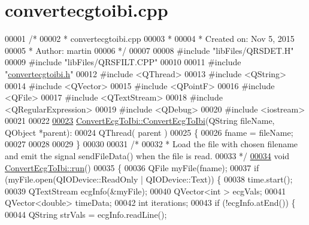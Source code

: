 \hypertarget{convertecgtoibi_8cpp_source}{}\section{convertecgtoibi.\+cpp}
\label{convertecgtoibi_8cpp_source}

\begin{DoxyCode}
00001 \textcolor{comment}{/*}
00002 \textcolor{comment}{ * convertecgtoibi.cpp}
00003 \textcolor{comment}{ *}
00004 \textcolor{comment}{ *  Created on: Nov 5, 2015}
00005 \textcolor{comment}{ *      Author: martin}
00006 \textcolor{comment}{ */}
00007 
00008 \textcolor{preprocessor}{#include "libFiles/QRSDET.H"}
00009 \textcolor{preprocessor}{#include "libFiles/QRSFILT.CPP"}
00010 
00011 \textcolor{preprocessor}{#include "\hyperlink{convertecgtoibi_8h}{convertecgtoibi.h}"}
00012 \textcolor{preprocessor}{#include <QThread>}
00013 \textcolor{preprocessor}{#include <QString>}
00014 \textcolor{preprocessor}{#include <QVector>}
00015 \textcolor{preprocessor}{#include <QPointF>}
00016 \textcolor{preprocessor}{#include <QFile>}
00017 \textcolor{preprocessor}{#include <QTextStream>}
00018 \textcolor{preprocessor}{#include <QRegularExpression>}
00019 \textcolor{preprocessor}{#include <QDebug>}
00020 \textcolor{preprocessor}{#include <iostream>}
00021 
00022 
\hypertarget{convertecgtoibi_8cpp_source.tex_l00023}{}\hyperlink{classConvertEcgToIbi_add4a7e9eceff1edadcce6e7aa417c05f}{00023} \hyperlink{classConvertEcgToIbi_add4a7e9eceff1edadcce6e7aa417c05f}{ConvertEcgToIbi::ConvertEcgToIbi}(QString fileName, QObject *parent):
00024 QThread( parent )
00025 \{
00026     fname = fileName;
00027 
00028 
00029 \}
00030 
00031 \textcolor{comment}{/*}
00032 \textcolor{comment}{ * Load the file with chosen filename and emit the signal sendFileData() when the file is read.}
00033 \textcolor{comment}{ */}
\hypertarget{convertecgtoibi_8cpp_source.tex_l00034}{}\hyperlink{classConvertEcgToIbi_a3d9ea57ed19352295382095febc82f71}{00034} \textcolor{keywordtype}{void} \hyperlink{classConvertEcgToIbi_a3d9ea57ed19352295382095febc82f71}{ConvertEcgToIbi::run}()
00035 \{
00036     QFile myFile(fname);
00037     \textcolor{keywordflow}{if} (myFile.open(QIODevice::ReadOnly | QIODevice::Text)) \{
00038         time.start();
00039         QTextStream ecgInfo(&myFile);
00040         QVector<int > ecgVals;
00041         QVector<double> timeData;
00042         \textcolor{keywordtype}{int} iterations;
00043         \textcolor{keywordflow}{if} (!ecgInfo.atEnd()) \{
00044             QString strVals = ecgInfo.readLine();

\end{DoxyCode}
